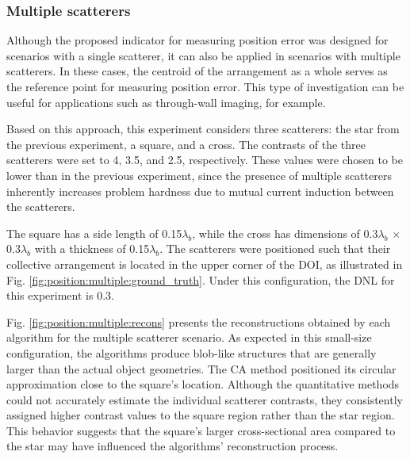 \documentclass{ieeeaccess}
\begin{document}
        \subsubsection{Multiple scatterers}\label{sec:results:position:multiple}

            Although the proposed indicator for measuring position error was designed for scenarios with a single scatterer, it can also be applied in scenarios with multiple scatterers. In these cases, the centroid of the arrangement as a whole serves as the reference point for measuring position error. This type of investigation can be useful for applications such as through-wall imaging, for example.

            Based on this approach, this experiment considers three scatterers: the star from the previous experiment, a square, and a cross. The contrasts of the three scatterers were set to 4, 3.5, and 2.5, respectively. These values were chosen to be lower than in the previous experiment, since the presence of multiple scatterers inherently increases problem hardness due to mutual current induction between the scatterers.

            The square has a side length of 0.15$\lambda_b$, while the cross has dimensions of 0.3$\lambda_b$ × 0.3$\lambda_b$ with a thickness of 0.15$\lambda_b$. The scatterers were positioned such that their collective arrangement is located in the upper corner of the DOI, as illustrated in Fig. \ref{fig:position:multiple:ground_truth}. Under this configuration, the DNL for this experiment is 0.3.

            Fig. \ref{fig:position:multiple:recons} presents the reconstructions obtained by each algorithm for the multiple scatterer scenario. As expected in this small-size configuration, the algorithms produce blob-like structures that are generally larger than the actual object geometries. The CA method positioned its circular approximation close to the square's location. Although the quantitative methods could not accurately estimate the individual scatterer contrasts, they consistently assigned higher contrast values to the square region rather than the star region. This behavior suggests that the square's larger cross-sectional area compared to the star may have influenced the algorithms' reconstruction process.
\end{document}
